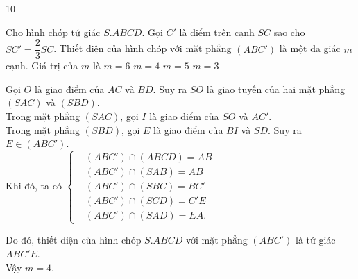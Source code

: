 \begin{indapan}{10}
\begin{ex}%
Cho hình chóp tứ giác $S.ABCD$. Gọi $C'$ là điểm trên cạnh $SC$ sao cho $SC'=\dfrac{2}{3}SC$. Thiết diện của hình chóp với mặt phẳng $\left(ABC'\right)$ là một đa giác $m$ cạnh. Giá trị của $m$ là
\choice
{$m=6$}
{\True $m=4$}
{$m=5$}
{$m=3$}
\loigiai
{
\immini
{
Gọi $O$ là giao điểm của $AC$ và $BD$. Suy ra $SO$ là giao tuyến của hai mặt phẳng $(SAC)$ và $(SBD)$.\\
Trong mặt phẳng $(SAC)$, gọi $I$ là giao điểm của $SO$ và $AC'$.\\
Trong mặt phẳng $(SBD)$, gọi $E$ là giao điểm của $BI$ và $SD$. Suy ra $E\in \left(ABC'\right)$.\\
Khi đó, ta có $\left\{\begin{aligned}&\left(ABC'\right)\cap (ABCD)=AB \\&\left(ABC'\right)\cap (SAB)=AB \\&\left(ABC'\right)\cap (SBC)=BC' \\&\left(ABC'\right)\cap (SCD)=C'E \\&\left(ABC'\right)\cap (SAD)=EA.\end{aligned}\right.$
}
{
}
\noindent
Do đó, thiết diện của hình chóp $S.ABCD$ với mặt phẳng $\left(ABC'\right)$ là tứ giác $ABC'E$.\\
Vậy $m=4$.
}
\end{ex}


\end{indapan}
